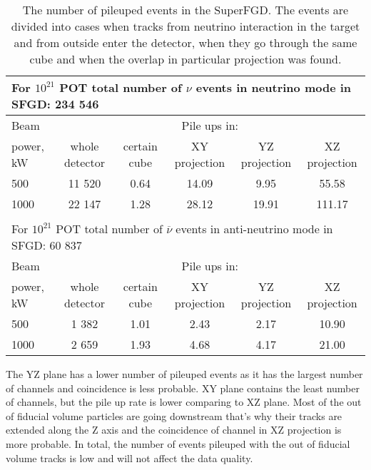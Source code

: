 \documentclass[main.tex]{subfiles}
\begin{document}
\begin{table}[!ht]
	\begin{tabular}{|l|ccccc|}
	\multicolumn{6}{l}{For $10^{21}$ POT total number of $\nu$ events in neutrino mode in  SFGD: 234 546} \\
	\hline
	Beam  					& \multicolumn{5}{c}{Pile ups in:} \\
	power, kW				& whole detector 	& certain cube 	& XY projection 	& YZ projection 	& XZ projection \\
	\hline
	500							& 11 520					& 0.64  				& 14.09					  & 9.95 						& 55.58 \\
	1000 						& 22 147 					& 1.28 					& 28.12 					& 19.91 					& 111.17 \\
	\hline
	\hline
	\multicolumn{6}{l}{} \\
	\multicolumn{6}{l}{For $10^{21}$ POT total number of $\overline{\nu}$ events in anti-neutrino mode in SFGD: 60 837} \\
	\hline
	Beam  					& \multicolumn{5}{c}{Pile ups in:} \\
	power, kW				& whole detector 	& certain cube 	& XY projection 	& YZ projection 	& XZ projection \\
	\hline
	500							&  1 382					& 1.01  				&  2.43					  & 2.17  					& 10.90 \\
	1000 						&  2 659 					& 1.93 					&  4.68 					& 4.17   					& 21.00 \\
	\hline
	\end{tabular}
	\caption{The number of pileuped events in the SuperFGD. The events are divided into cases when tracks from neutrino interaction in the target and from outside enter the detector, when they go through the same cube and when the overlap in particular projection was found.}
	\label{tbl:up:sfgd:pile_up}
\end{table}

The YZ plane has a lower number of pileuped events  as it has the largest number of channels and coincidence is less probable. XY plane contains the least number of channels, but the pile up rate is lower comparing to XZ plane. Most of the out of fiducial volume particles are going downstream that's why their tracks are extended along the Z axis and the coincidence of channel in XZ projection is more probable. In total, the number of events pileuped with the out of fiducial volume tracks is low and will not affect the data quality.
\end{document}
